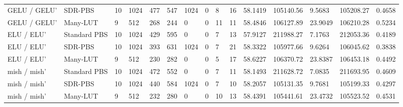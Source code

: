 \begin{tabular}{lllllllllllllll}
GELU / GELU' & SDR-PBS & 10 & 1024 & 477 & 547 & 1024 & 0 & 8 & 16 & 58.1419 & 105140.56 & 9.5683 & 105208.27 & 0.4658 \\
GELU / GELU' & Many-LUT & 9 & 512 & 268 & 244 & 0 & 0 & 11 & 11 & 58.4846 & 106127.89 & 23.9049 & 106210.28 & 0.5234 \\
ELU / ELU' & Standard PBS & 10 & 1024 & 429 & 595 & 0 & 0 & 7 & 13 & 57.9127 & 211988.27 & 7.1763 & 212053.36 & 0.4189 \\
ELU / ELU' & SDR-PBS & 10 & 1024 & 393 & 631 & 1024 & 0 & 7 & 21 & 58.3322 & 105977.66 & 9.6264 & 106045.62 & 0.3838 \\
ELU / ELU' & Many-LUT & 9 & 512 & 230 & 282 & 0 & 0 & 5 & 17 & 58.6227 & 106370.72 & 23.8387 & 106453.18 & 0.4492 \\
mish / mish' & Standard PBS & 10 & 1024 & 472 & 552 & 0 & 0 & 7 & 11 & 58.1493 & 211628.72 & 7.0835 & 211693.95 & 0.4609 \\
mish / mish' & SDR-PBS & 10 & 1024 & 440 & 584 & 1024 & 0 & 7 & 10 & 58.2057 & 105131.35 & 9.7681 & 105199.33 & 0.4297 \\
mish / mish' & Many-LUT & 9 & 512 & 232 & 280 & 0 & 0 & 10 & 13 & 58.4391 & 105441.61 & 23.4732 & 105523.52 & 0.4531 \\
\bottomrule
\end{tabular}
